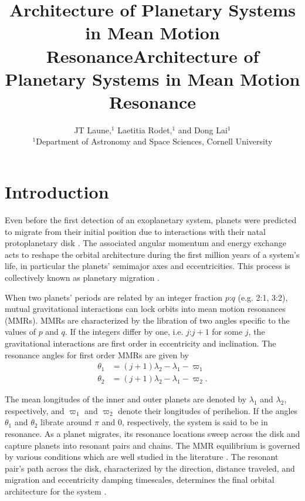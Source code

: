 \documentclass{mnras}
\title[MMR Architecture]{Architecture of Planetary Systems in Mean Motion Resonance}
\author[Laune et al.]{
JT Laune,$^{1}$
Laetitia Rodet,$^{1}$
and Dong Lai$^{1}$
\\
$^{1}$Department of Astronomy and Space Sciences, Cornell University\\}
\date{}
\title{Architecture of Planetary Systems in Mean Motion Resonance}
\begin{document}
\maketitle
\maketitle

\section{Introduction}
\label{sec:orgf78e8b1}

Even before the first detection of an exoplanetary system, planets
were predicted to migrate from their initial position due to
interactions with their natal protoplanetary disk
\cite{lin79_tidal_torques_accret_discs_binar,goldreich_excitation_1979,goldreich_disk-satellite_1980-1}.
The associated angular momentum and energy exchange acts to reshape
the orbital architecture during the first million years of a system's
life, in particular the planets' semimajor axes and eccentricities.
This process is collectively known as planetary migration
\cite{nelson_planetary_2018}.

When two planets' periods are related by an integer fraction \(p\):\(q\)
(e.g. 2:1, 3:2), mutual gravitational interactions can lock orbits
into mean motion resonances (MMRs).  MMRs are characterized by the
libration of two angles specific to the values of \(p\) and \(q\).  If the
integers differ by one, i.e. \(j\):\(j+1\) for some \(j\), the gravitational
interactions are first order in eccentricity and inclination.  The
resonance angles for first order MMRs are given by
\begin{align}
\label{circangles1}
 \theta_1 &= (j+1)\lambda_2 - \lambda_1 - \varpi_1 \\
\label{circangles2}
 \theta_2 &= (j+1)\lambda_2 - \lambda_1 - \varpi_2.
\end{align}

\noindent The mean longitudes of the inner and outer planets
are denoted by \(\lambda_1\) and \(\lambda_2\), respectively, and
\(\varpi_1\) and \(\varpi_2\) denote their longitudes of perihelion.  If
the angles \(\theta_1\) and \(\theta_2\) librate around \(\pi\) and \(0\),
respectively, the system is said to be in resonance.  As a planet
migrates, its resonance locations sweep across the disk and capture
planets into resonant pairs and chains.  The MMR equilibrium is
governed by various conditions which are well studied in the
literature
\cite{henrard_second_1983,deck_migration_2015,goldreich_overstable_2014,xu_migration_2018,henrard_second_1983}.
The resonant pair's path across the disk, characterized by the
direction, distance traveled, and migration and eccentricity damping
timescales, determines the final orbital architecture for the system
\cite{cresswell_evolution_2006,cresswell_three-dimensional_2008}.
\end{document}
